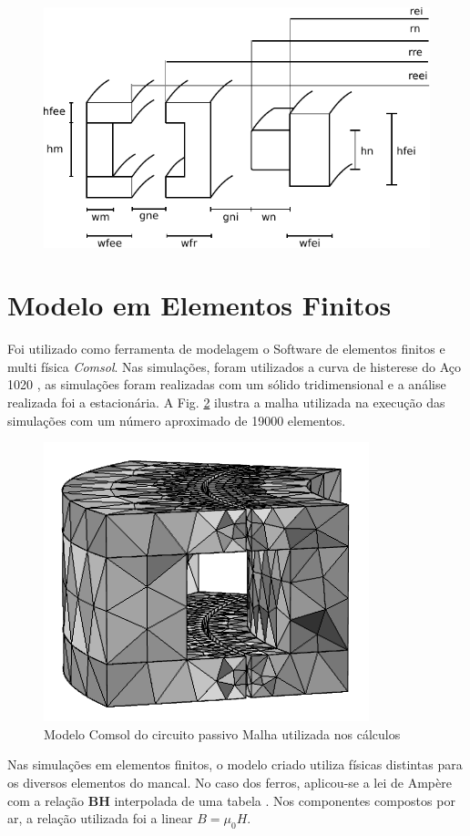 \begin{figure}[th!]
	\centering
	\includegraphics[width=0.8\linewidth]{Figs/modelo_dimensoes}
	\caption{}
	\label{fig:modelo_dimensoes}
\end{figure}

 \section{Modelo em Elementos Finitos}
 
 Foi utilizado como ferramenta de modelagem o Software de elementos finitos e multi física \textit{Comsol}. Nas simulações, foram utilizados a curva de histerese do Aço 1020 , as simulações foram realizadas com um sólido tridimensional e a análise realizada foi a estacionária.  A Fig. \ref{Fig:Simulacao:Passivo:Mesh} ilustra a malha utilizada na execução das simulações com um número aproximado de 19000 elementos.
 
 \begin{figure}[!ht]
 	\centering
 	\includegraphics[width=0.5 \columnwidth,angle=0]{Figs/Simulacoes/Passivo/3D_Mesh=1,2.png}
 	\caption{Modelo Comsol do circuito passivo Malha utilizada nos cálculos}
 	\label{Fig:Simulacao:Passivo:Mesh}
 \end{figure}
 
Nas simulações em elementos finitos, o modelo criado utiliza físicas distintas para os diversos elementos do mancal. No caso dos ferros, aplicou-se a lei de Ampère com a relação \textbf{BH} interpolada de uma tabela \citep{MagWeb2015}. Nos componentes compostos por ar, a relação utilizada foi a linear $B=\mu_0 H$. 

